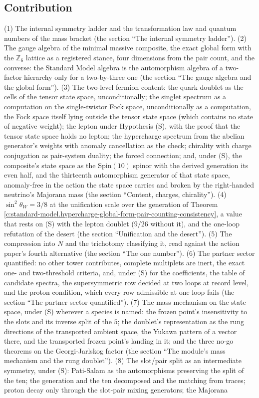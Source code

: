 \documentclass[11pt]{article}
\theoremstyle{definition}
\theoremstyle{plain}
\begin{document}
\subsection*{Contribution}
\label{c:note.standard-model.setting-contribution}
(1) The internal symmetry ladder and the transformation law and quantum numbers of the mass bracket (the section ``The internal symmetry ladder''). (2) The gauge algebra of the minimal massive composite, the exact global form with the $\mathbb{Z}_{6}$ lattice as a registered stance, four dimensions from the pair count, and the converse: the Standard Model algebra is the automorphism algebra of a two-factor hierarchy only for a two-by-three one (the section ``The gauge algebra and the global form''). (3) The two-level fermion content: the quark doublet as the cells of the tensor state space, unconditionally; the singlet spectrum as a computation on the single-twistor Fock space, unconditionally as a computation, the Fock space itself lying outside the tensor state space (which contains no state of negative weight); the lepton under Hypothesis (S), with the proof that the tensor state space holds no lepton; the hypercharge spectrum from the abelian generator's weights with anomaly cancellation as the check; chirality with charge conjugation as pair-system duality; the forced connection; and, under (S), the composite's state space as the $\mathrm{Spin}(10)$ spinor with the derived generation its even half, and the thirteenth automorphism generator of that state space, anomaly-free in the action the state space carries and broken by the right-handed neutrino's Majorana mass (the section ``Content, charges, chirality''). (4) $\sin^{2}\theta_{W} = 3/8$ at the unification scale over the generation of Theorem \ref{c:standard-model.hypercharge-global-form-pair-counting-consistency}, a value that rests on (S) with the lepton doublet ($9/26$ without it), and the one-loop refutation of the desert (the section ``Unification and the desert''). (5) The compression into $N$ and the trichotomy classifying it, read against the action paper's fourth alternative (the section ``The one number''). (6) The partner sector quantified: no other tower contributes, complete multiplets are inert, the exact one- and two-threshold criteria, and, under (S) for the coefficients, the table of candidate spectra, the supersymmetric row decided at two loops at record level, and the proton condition, which every row admissible at one loop fails (the section ``The partner sector quantified''). (7) The mass mechanism on the state space, under (S) wherever a species is named: the frozen point's insensitivity to the slots and its inverse split of the $5$; the doublet's representation as the rung directions of the transported ambient space, the Yukawa pattern of a vector there, and the transported frozen point's landing in it; and the three no-go theorems on the Georgi-Jarlskog factor (the section ``The module's mass mechanism and the rung doublet''). (8) The slot/pair split as an intermediate symmetry, under (S): Pati-Salam as the automorphisms preserving the split of the ten; the generation and the ten decomposed and the matching from traces; proton decay only through the slot-pair mixing generators; the Majorana 
\end{document}
